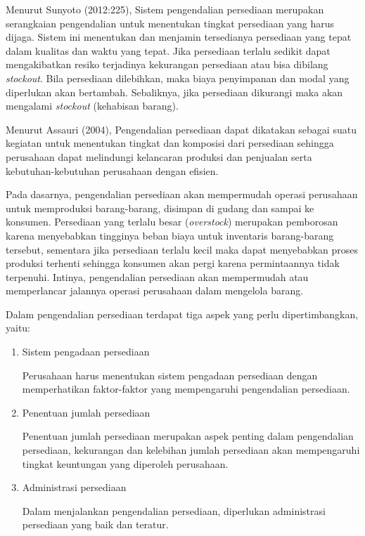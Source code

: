 Menurut Sunyoto (2012:225), Sistem pengendalian persediaan merupakan serangkaian pengendalian untuk menentukan tingkat persediaan yang harus dijaga. Sistem ini menentukan dan menjamin tersedianya persediaan yang tepat dalam kualitas dan waktu yang tepat. Jika persediaan terlalu sedikit dapat mengakibatkan resiko terjadinya kekurangan persediaan atau bisa dibilang \textit{stockout}. Bila persediaan dilebihkan, maka biaya penyimpanan dan modal yang diperlukan akan bertambah. Sebaliknya, jika persediaan dikurangi maka akan mengalami \textit{stockout} (kehabisan barang).
 
Menurut Assauri (2004), Pengendalian persediaan dapat dikatakan sebagai suatu kegiatan untuk menentukan tingkat dan komposisi dari persediaan sehingga perusahaan dapat melindungi kelancaran produksi dan penjualan serta kebutuhan-kebutuhan perusahaan dengan efisien.

Pada dasarnya, pengendalian persediaan akan mempermudah operasi perusahaan untuk memproduksi barang-barang, disimpan di gudang dan sampai ke konsumen. Persediaan yang terlalu besar (\textit{overstock}) merupakan pemborosan karena menyebabkan tingginya beban biaya untuk inventaris barang-barang tersebut, sementara jika persediaan terlalu kecil maka dapat menyebabkan proses produksi terhenti sehingga konsumen akan pergi karena permintaannya tidak terpenuhi. Intinya, pengendalian persediaan akan mempermudah atau memperlancar jalannya operasi perusahaan dalam mengelola barang. 

Dalam pengendalian persediaan terdapat tiga aspek yang perlu dipertimbangkan, yaitu:

\begin{enumerate}
	\item Sistem pengadaan persediaan
	
	Perusahaan harus menentukan sistem pengadaan persediaan dengan memperhatikan faktor-faktor yang mempengaruhi pengendalian persediaan.

	\item Penentuan jumlah persediaan
	
	Penentuan jumlah persediaan merupakan aspek penting dalam pengendalian persediaan, kekurangan dan kelebihan jumlah persediaan akan mempengaruhi tingkat keuntungan yang diperoleh perusahaan.

	\item Administrasi persediaan
	
	Dalam menjalankan pengendalian persediaan, diperlukan administrasi persediaan yang baik dan teratur.
\end{enumerate}

